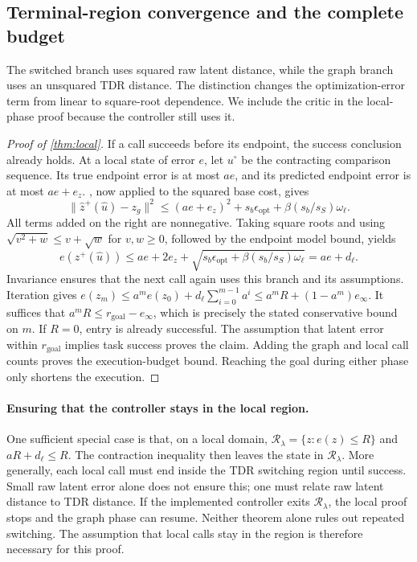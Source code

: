 \documentclass{article} %
\newcommand{\Rset}{\mathcal R_\lambda}
\theoremstyle{definition}
\theoremstyle{remark}
\begin{document}
\subsection{Terminal-region convergence and the complete budget}
\label{app:local-proof}
The switched branch uses squared raw latent distance, while the graph branch uses an
unsquared TDR distance. The distinction changes the optimization-error term from
linear to square-root dependence.
We include the critic in the local-phase proof because the controller still uses it.

\begin{proof}[Proof of \cref{thm:local}]
If a call succeeds before its endpoint, the success conclusion already holds.
At a local state of error $e$, let $u^\circ$ be the contracting comparison sequence.
Its true endpoint error is at most $ae$, and its predicted endpoint error is at most
$ae+e_z$. , now applied to the squared base cost, gives
\[
 \|\hat z^+(\hat u)-z_g\|^2
 \le (ae+e_z)^2+
       s_b\epsilon_{\mathrm{opt}}+\beta(s_b/s_S)\omega_\ell.
\]
All terms added on the right are nonnegative. Taking square roots and using
$\sqrt{v^2+w}\le v+\sqrt w$ for $v,w\ge0$, followed by the endpoint model bound,
yields
\[
 e(z^+(\hat u))
 \le ae+2e_z+
       \sqrt{s_b\epsilon_{\mathrm{opt}}+\beta(s_b/s_S)\omega_\ell}
 =ae+d_\ell .
\]
Invariance ensures that the next call again uses this branch and its assumptions.
Iteration gives
$e(z_m)\le a^m e(z_0)+d_\ell\sum_{i=0}^{m-1}a^i
\le a^mR+(1-a^m)e_\infty$.
It suffices that $a^mR\le r_{\mathrm{goal}}-e_\infty$, which is precisely the
stated conservative bound on $m$. If $R=0$, entry is already successful.
The assumption that latent error within $r_{\mathrm{goal}}$ implies task success proves the claim.
Adding the graph and local call counts proves the execution-budget bound.
Reaching the goal during either phase only shortens the execution.
\end{proof}

\paragraph{Ensuring that the controller stays in the local region.}
One sufficient special case is that, on a local domain,
$\Rset=\{z:e(z)\le R\}$ and $aR+d_\ell\le R$.
The contraction inequality then leaves the state in $\Rset$.
More generally, each local call must end inside the TDR switching region until success.
Small raw latent error alone does not ensure this; one must relate raw latent distance
to TDR distance.
If the implemented controller exits $\Rset$, the local proof stops and the graph
phase can resume. Neither theorem alone rules out repeated switching.
The assumption that local calls stay in the region is therefore necessary for this proof.
\end{document}
